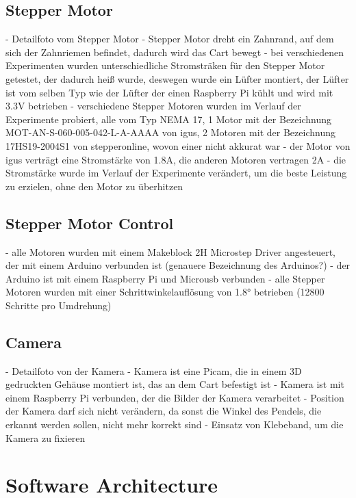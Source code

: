 \subsection{Stepper Motor}
- Detailfoto vom Stepper Motor
- Stepper Motor dreht ein Zahnrand, auf dem sich der Zahnriemen befindet, dadurch wird das Cart bewegt
- bei verschiedenen Experimenten wurden unterschiedliche Stromsträken für den Stepper Motor getestet, der dadurch heiß wurde, deswegen wurde ein Lüfter montiert, der Lüfter ist vom selben Typ wie der Lüfter der einen Raspberry Pi kühlt und wird mit 3.3V betrieben
- verschiedene Stepper Motoren wurden im Verlauf der Experimente probiert, alle vom Typ NEMA 17, 1 Motor mit der Bezeichnung MOT-AN-S-060-005-042-L-A-AAAA von igus, 2 Motoren mit der Bezeichnung 17HS19-2004S1 von stepperonline, wovon einer nicht akkurat war
- der Motor von igus verträgt eine Stromstärke von 1.8A, die anderen Motoren vertragen 2A
- die Stromstärke wurde im Verlauf der Experimente verändert, um die beste Leistung zu erzielen, ohne den Motor zu überhitzen

\subsection{Stepper Motor Control}
- alle Motoren wurden mit einem Makeblock 2H Microstep Driver angesteuert, der mit einem Arduino verbunden ist (genauere Bezeichnung des Arduinos?)
- der Arduino ist mit einem Raspberry Pi und Microusb verbunden
- alle Stepper Motoren wurden mit einer Schrittwinkelauflösung von 1.8° betrieben (12800 Schritte pro Umdrehung)

\subsection{Camera}
- Detailfoto von der Kamera
- Kamera ist eine Picam, die in einem 3D gedruckten Gehäuse montiert ist, das an dem Cart befestigt ist
- Kamera ist mit einem Raspberry Pi verbunden, der die Bilder der Kamera verarbeitet
- Position der Kamera darf sich nicht verändern, da sonst die Winkel des Pendels, die erkannt werden sollen, nicht mehr korrekt sind
- Einsatz von Klebeband, um die Kamera zu fixieren

\section{Software Architecture}

